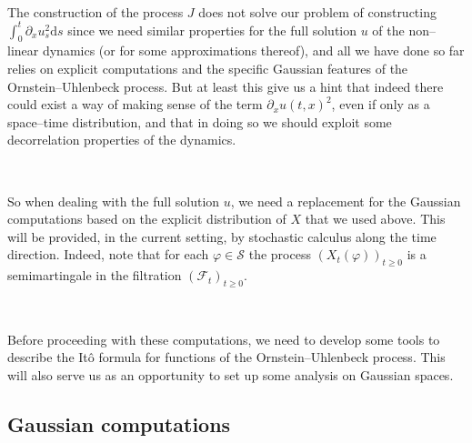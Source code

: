 \documentclass[a4paper,11pt]{article}
\newcommand{\mathd}{\mathrm{d}}
\newcommand{\CS}{\mathscr{S}}
\begin{document}
\

The construction of the process $J$ does not solve our problem of constructing $\int_0^t \partial_x u_s^2 \mathd s$ since we need
similar properties for the full solution $u$ of the non--linear dynamics (or
for some approximations thereof), and all we have done so far relies on
explicit computations and the specific Gaussian features of the
Ornstein--Uhlenbeck process. But at least this give us a hint that indeed
there could exist a way of making sense of the term $\partial_x u (t, x)^2$,
even if only as a space--time distribution, and that in doing so we should
exploit some decorrelation properties of the dynamics.

\

So when dealing with the full solution $u$, we need a replacement for the
Gaussian computations based on the explicit distribution of $X$ that we used above. This will be provided, in the current
setting, by stochastic calculus along the time direction. Indeed, note that
for each $\varphi \in \CS$ the process $(X_t (\varphi))_{t \geqslant 0}$ is a
semimartingale in the filtration $(\mathcal{F}_t)_{t \geqslant 0}$.

\

Before proceeding with these computations, we need to develop some tools to
describe the It{\^o} formula for functions of the Ornstein--Uhlenbeck process.
This will also serve us as an opportunity to set up some analysis on
Gaussian spaces.

\subsection{Gaussian computations}
\end{document}
